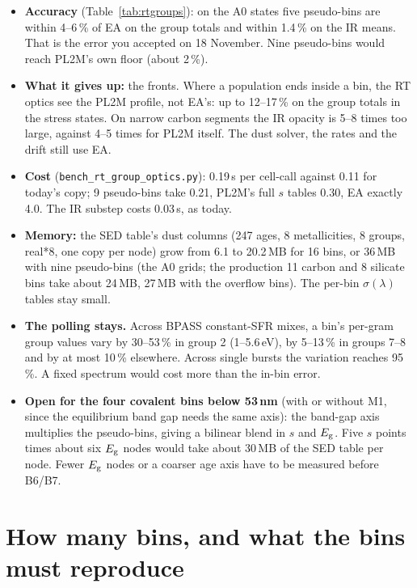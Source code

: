 \documentclass[11pt,a4paper]{article}
\newcommand{\Eg}{E_{\rm g}}
\begin{document}
\begin{itemize}
\item \textbf{Accuracy} (Table~\ref{tab:rtgroups}): on the A0 states five pseudo-bins are within 4--6\,\% of EA on the
  group totals and within 1.4\,\% on the IR means. That is the error you accepted on 18 November. Nine pseudo-bins
  would reach PL2M's own floor (about 2\,\%).
\item \textbf{What it gives up:} the fronts. Where a population ends inside a bin, the RT optics see the PL2M profile,
  not EA's: up to 12--17\,\% on the group totals in the stress states. On narrow carbon segments the IR opacity is
  5--8 times too large, against 4--5 times for PL2M itself. The dust solver, the rates and the drift still use EA.
\item \textbf{Cost} (\texttt{bench\_rt\_group\_optics.py}): 0.19\,\textmu s per cell-call against 0.11 for today's
  copy; 9 pseudo-bins take 0.21, PL2M's full $s$ tables 0.30, EA exactly 4.0. The IR substep costs 0.03\,\textmu s, as
  today.
\item \textbf{Memory:} the SED table's dust columns (247 ages, 8 metallicities, 8 groups, real*8, one copy per node)
  grow from 6.1 to 20.2\,MB for 16 bins, or 36\,MB with nine pseudo-bins (the A0 grids; the production 11 carbon
  and 8 silicate bins take about 24\,MB, 27\,MB with the overflow bins). The per-bin $\sigma(\lambda)$ tables stay
  small.
\item \textbf{The polling stays.} Across BPASS constant-SFR mixes, a bin's per-gram group values vary by 30--53\,\% in
  group 2 (1--5.6\,eV), by 5--13\,\% in groups 7--8 and by at most 10\,\% elsewhere. Across single bursts the variation
  reaches 95\,\%. A fixed spectrum would cost more than the in-bin error.
\item \textbf{Open for the four covalent bins below 53\,nm} (with or without M1, since the equilibrium band gap
  needs the same axis): the band-gap axis multiplies the pseudo-bins, giving a bilinear blend in $s$ and $\Eg$. Five
  $s$ points times about six $\Eg$ nodes would take about 30\,MB of the SED table per node. Fewer $\Eg$ nodes or a coarser age axis have to be measured before B6/B7.
\end{itemize}

\section{How many bins, and what the bins must reproduce}\label{sec:bins}
\end{document}
